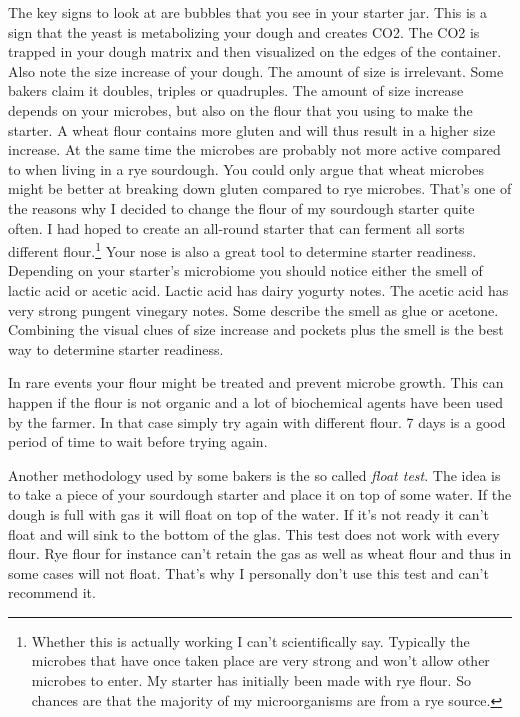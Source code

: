 The key signs to look at are bubbles that you see in your starter
jar. This is a sign that the yeast is metabolizing your
dough and creates CO2. The CO2 is trapped in your dough
matrix and then visualized on the edges of the container.
Also note the size increase of your dough. The amount of size
is irrelevant. Some bakers claim it doubles, triples or quadruples.
The amount of size increase depends on your microbes, but also on
the flour that you using to make the starter. A wheat flour contains
more gluten and will thus result in a higher size increase. At
the same time the microbes are probably not more active compared
to when living in a rye sourdough. You could only argue that
wheat microbes might be better at breaking down gluten compared
to rye microbes. That's one of the reasons why I decided to change
the flour of my sourdough starter quite often. I had hoped to create
an all-round starter that can ferment all sorts different flour.\footnote
{Whether this is actually working I can't scientifically say.
Typically the microbes that have once taken place are very strong
and won't allow other microbes to enter. My starter has initially
been made with rye flour. So chances are that the majority of
my microorganisms are from a rye source.} Your nose is also
a great tool to determine starter readiness. Depending on
your starter's microbiome you should notice either the smell
of lactic acid or acetic acid. Lactic acid has dairy yogurty notes.
The acetic acid has very strong pungent vinegary notes. Some
describe the smell as glue or acetone. Combining the visual clues
of size increase and pockets plus the smell is the best way
to determine starter readiness.

In rare events your flour might be treated and prevent microbe growth.
This can happen if the flour is not organic and a lot of biochemical
agents have been used by the farmer. In that case simply try again
with different flour. 7 days is a good period of time to wait before
trying again.

Another methodology used by some bakers is the so called \emph{float test}.
The idea is to take a piece of your sourdough starter and place it
on top of some water. If the dough is full with gas it will float
on top of the water. If it's not ready it can't float and will
sink to the bottom of the glas. This test does not work with every flour.
Rye flour for instance can't retain the gas as well as wheat flour
and thus in some cases will not float. That's why I personally
don't use this test and can't recommend it.

